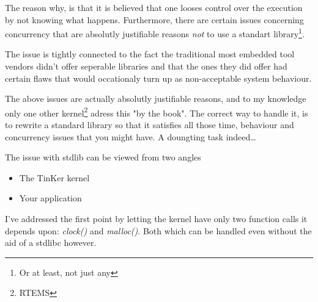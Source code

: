 The reason why, is that it is believed that one looses control over the execution by not knowing what happens. Furthermore, there are certain issues concerning concurrency that are absolutly justifiable reasons \textit{not} to use a standart library\footnote{Or at least, not just any}.

The issue is tightly connected to the fact the traditional most embedded tool vendors didn't offer seperable libraries and that the ones they did offer had certain flaws that would occationaly turn up as non-acceptable system behaviour.

The above issues are actually absolutly justifiable reasons, and to my knowledge only one other kernel\footnote{RTEMS} adress this "by the book". The correct way to handle it, is to rewrite a standard library so that it satisfies all those time, behaviour and concurrency issues that you might have. A doungting task indeed\ldots

The issue with stdlib can be viewed from two angles
\begin{itemize}
	\item The TinKer kernel
	\item Your application
\end{itemize}
I've addressed the first point by letting the kernel have only two function calls it depends upon: \textit{clock()} and \textit{malloc()}. Both which can be handled even without the aid of a stdlibc however.

